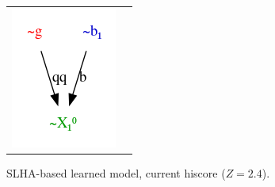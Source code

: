 \documentclass[11pt,singleside,a4paper,makeidx,notitlepage]{article}
\begin{document}
\begin{figure}[h!t]
\begin{center}
\begin{tabular}{cc}
\includegraphics[width=.49\textwidth]{decays.png}
\end{tabular}
\caption{SLHA-based learned model, current hiscore ($Z=2.4$).}
\label{fig_hiscore}
\end{center}
\end{figure}

%
% 
\end{document}
